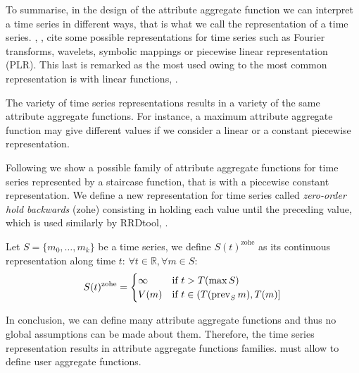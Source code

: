 
To summarise, in the design of the attribute aggregate function we can
interpret a time series in different ways, that is what we call the
representation of a time series. \citeauthor{last:keogh},
\cite{last:keogh}, cite some possible representations for time series
such as Fourier transforms, wavelets, symbolic mappings or piecewise
linear representation (PLR). This last is remarked as the most used
owing to the most common representation is with linear functions,
\cite{keogh01}.

The variety of time series representations results in a variety of the
same attribute aggregate functions. For instance, a maximum attribute
aggregate function may give different values if we consider a linear
or a constant piecewise representation.

Following we show a possible family of attribute aggregate functions
for time series represented by a staircase function, that is with a
piecewise constant representation.  We define a new representation for
time series called \emph{zero-order hold backwards} (zohe) consisting
in holding each value until the preceding value, which is used
similarly by RRDtool, \cite{lisa98:oetiker}.

Let $S=\{m_0,\ldots,m_k\}$ be a time series, we define
$S(t)^{\text{zohe}}$ as its continuous representation along time $t$:
$\forall t \in \mathbb{R} ,\forall m \in S:$
\begin{equation}
 S(t)^{\text{zohe}} =  
\begin{cases}
  \infty & \text{if } t > T(\max S) \\
  V(m)   & \text{if } t\in (T(\operatorname*{prev}_S m),T(m)]
\end{cases}
\label{eq:zohe}
\end{equation}

In conclusion, we can define many attribute aggregate functions and
thus no global assumptions can be made about them.  Therefore, the
time series representation results in attribute aggregate functions
families.   must allow to define user aggregate functions.








